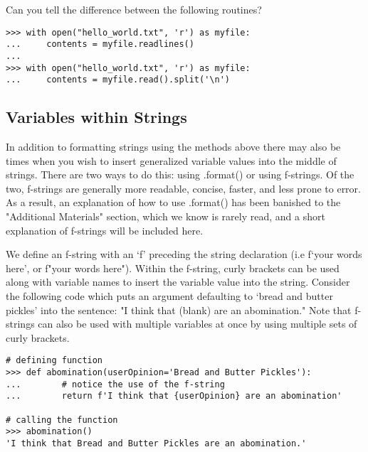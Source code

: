 Can you tell the difference between the following routines?

\begin{lstlisting}
>>> with open("hello_world.txt", 'r') as myfile:
...     contents = myfile.readlines()
...
>>> with open("hello_world.txt", 'r') as myfile:
...     contents = myfile.read().split('\n')
\end{lstlisting}

\subsection*{Variables within Strings}%

In addition to formatting strings using the methods above there may also be times when you wish to insert generalized variable values into the middle of strings. There are two ways to do this: using .format() or using f-strings. Of the two, f-strings are generally more readable, concise, faster, and less prone to error. As a result, an explanation of how to use .format() has been banished to the "Additional Materials" section, which we know is rarely read, and a short explanation of f-strings will be included here.

We define an f-string with an `f' preceding the string declaration (i.e f`your words here', or f"your words here"). Within the f-string, curly brackets can be used along with variable names to insert the variable value into the string. Consider the following code which puts an argument defaulting to `bread and butter pickles' into the sentence: "I think that (blank) are an abomination." Note that f-strings can also be used with multiple variables at once by using multiple sets of curly brackets.

\begin{lstlisting}
# defining function
>>> def abomination(userOpinion='Bread and Butter Pickles'):
...        # notice the use of the f-string
...        return f'I think that {userOpinion} are an abomination'

# calling the function
>>> abomination()
'I think that Bread and Butter Pickles are an abomination.'

\end{lstlisting}

